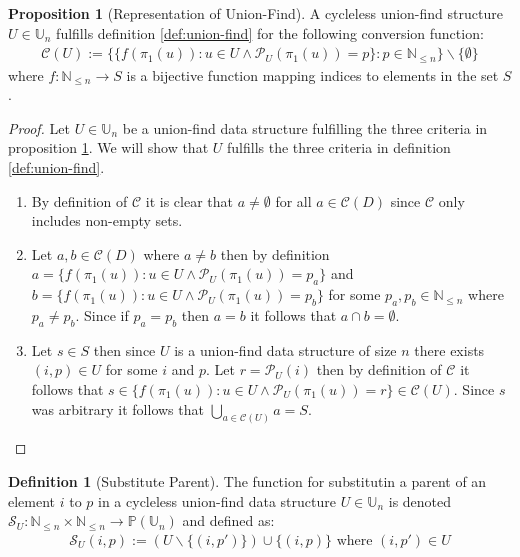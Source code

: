 \documentclass[a4paper,12pt]{article}
\theoremstyle{definition}
\newtheorem{definition}{Definition}[section]
\newtheorem{proposition}{Proposition}[section]
\begin{document}
\begin{proposition}[Representation of
    Union-Find]\label{def:representation-union-find} A cycleless union-find structure $U
    \in \mathbb{U}_n$ fulfills definition \ref{def:union-find} for the following conversion function:
    \begin{align*}
        \mathcal{C}(U) := \{\{f(\pi_1(u)) : u \in U \land \mathcal{P}_U(\pi_1(u)) = p \} : p \in \mathbb{N}_{\leq n}\} \backslash \{\emptyset\}
    \end{align*}
    where $f : \mathbb{N}_{\leq n} \to S$ is a bijective function mapping
    indices to elements in the set $S$.
\end{proposition}
\begin{proof}
    Let $U \in \mathbb{U}_n$ be a union-find data structure fulfilling the three
    criteria in proposition \ref{def:representation-union-find}. We will show
    that $U$ fulfills the three criteria in definition \ref{def:union-find}.

    \begin{enumerate}
        \item By definition of $\mathcal{C}$ it is clear that $a \neq \emptyset$
        for all $a \in \mathcal{C}(D)$ since $\mathcal{C}$ only includes
        non-empty sets.
        \item Let $a, b \in \mathcal{C}(D)$ where $a \neq b$ then by definition
        $a = \{f(\pi_1(u)) : u \in U \land \mathcal{P}_U(\pi_1(u)) = p_a \}$ and
        $b = \{f(\pi_1(u)) : u \in U \land \mathcal{P}_U(\pi_1(u)) = p_b \}$ for
        some $p_a, p_b \in \mathbb{N}_{\leq n}$ where $p_a \neq p_b$. Since if
        $p_a = p_b$ then $a = b$ it follows that $a \cap b = \emptyset$.
        \item Let $s \in S$ then since $U$ is a union-find data structure of size
        $n$ there exists $(i, p) \in U$ for some $i$ and $p$. Let $r =
        \mathcal{P}_U(i)$ then by definition of $\mathcal{C}$ it follows that $s
        \in \{f(\pi_1(u)) : u \in U \land \mathcal{P}_U(\pi_1(u)) = r \} \in
        \mathcal{C}(U)$. Since $s$ was arbitrary it follows that $\bigcup_{a \in
        \mathcal{C}(U)} a = S$.
    \end{enumerate}
\end{proof}

\begin{definition}[Substitute Parent]
    The function for substitutin a parent of an element $i$ to $p$ in a
    cycleless union-find data structure $U \in \mathbb{U}_n$ is denoted
    $\mathcal{S}_U : \mathbb{N}_{\leq n} \times \mathbb{N}_{\leq n} \to
    \mathbb{P}(\mathbb{U}_n)$ and defined as:
    \begin{align*}
        \mathcal{S}_U(i, p) := (U \backslash \{(i, p')\}) \cup \{(i, p)\} \text{ where } (i, p') \in U
    \end{align*}
\end{definition}
\end{document}
